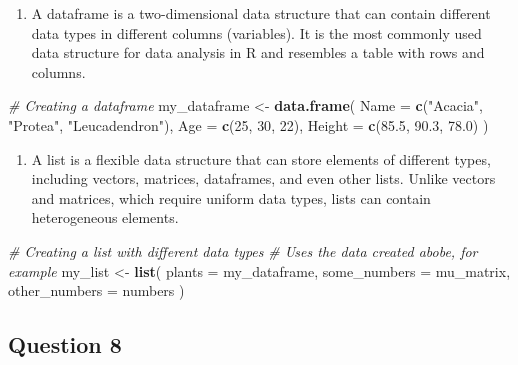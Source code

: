 \documentclass[
  10t,
]{article}
\newenvironment{Shaded}{\begin{snugshade}}{\end{snugshade}}
\newcommand{\AttributeTok}[1]{\textcolor[rgb]{0.13,0.29,0.53}{#1}}
\newcommand{\CommentTok}[1]{\textcolor[rgb]{0.56,0.35,0.01}{\textit{#1}}}
\newcommand{\DecValTok}[1]{\textcolor[rgb]{0.00,0.00,0.81}{#1}}
\newcommand{\FloatTok}[1]{\textcolor[rgb]{0.00,0.00,0.81}{#1}}
\newcommand{\FunctionTok}[1]{\textcolor[rgb]{0.13,0.29,0.53}{\textbf{#1}}}
\newcommand{\NormalTok}[1]{#1}
\newcommand{\OtherTok}[1]{\textcolor[rgb]{0.56,0.35,0.01}{#1}}
\newcommand{\StringTok}[1]{\textcolor[rgb]{0.31,0.60,0.02}{#1}}
\providecommand{\tightlist}{%
  \setlength{\itemsep}{0pt}\setlength{\parskip}{0pt}}
\begin{document}
\begin{enumerate}
\def\labelenumi{(\alph{enumi})}
\setcounter{enumi}{2}
\tightlist
\item
  A dataframe is a two-dimensional data structure that can contain
  different data types in different columns (variables). It is the most
  commonly used data structure for data analysis in R and resembles a
  table with rows and columns.
\end{enumerate}

\begin{Shaded}
\begin{Highlighting}[]
\CommentTok{\# Creating a dataframe}
\NormalTok{my\_dataframe }\OtherTok{\textless{}{-}} \FunctionTok{data.frame}\NormalTok{(}
  \AttributeTok{Name =} \FunctionTok{c}\NormalTok{(}\StringTok{"Acacia"}\NormalTok{, }\StringTok{"Protea"}\NormalTok{, }\StringTok{"Leucadendron"}\NormalTok{),}
  \AttributeTok{Age =} \FunctionTok{c}\NormalTok{(}\DecValTok{25}\NormalTok{, }\DecValTok{30}\NormalTok{, }\DecValTok{22}\NormalTok{),}
  \AttributeTok{Height =} \FunctionTok{c}\NormalTok{(}\FloatTok{85.5}\NormalTok{, }\FloatTok{90.3}\NormalTok{, }\FloatTok{78.0}\NormalTok{)}
\NormalTok{)}
\end{Highlighting}
\end{Shaded}

\begin{enumerate}
\def\labelenumi{(\alph{enumi})}
\setcounter{enumi}{3}
\tightlist
\item
  A list is a flexible data structure that can store elements of
  different types, including vectors, matrices, dataframes, and even
  other lists. Unlike vectors and matrices, which require uniform data
  types, lists can contain heterogeneous elements.
\end{enumerate}

\begin{Shaded}
\begin{Highlighting}[]
\CommentTok{\# Creating a list with different data types}
\CommentTok{\# Uses the data created abobe, for example}
\NormalTok{my\_list }\OtherTok{\textless{}{-}} \FunctionTok{list}\NormalTok{(}
  \AttributeTok{plants =}\NormalTok{ my\_dataframe,}
  \AttributeTok{some\_numbers =}\NormalTok{ mu\_matrix,}
  \AttributeTok{other\_numbers =}\NormalTok{ numbers}
\NormalTok{  )}
\end{Highlighting}
\end{Shaded}

\subsection{Question 8}\label{question-8}
\end{document}
